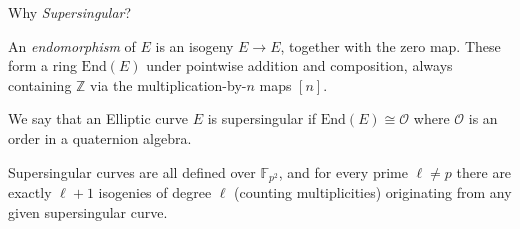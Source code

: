 \documentclass[10pt,aspectratio=169]{beamer}
\begin{document}
\begin{frame}{Why \emph{Supersingular}?}
  \begin{definition}
    An \emph{endomorphism} of $E$ is an isogeny $E \to E$, together with the zero map. These form a
    ring $\text{End}(E)$ under pointwise addition and composition, always containing $\mathbb{Z}$ via
    the multiplication-by-$n$ maps $[n]$.
  \end{definition}
  \vspace{0.5em}
  \begin{definition}
    We say that an Elliptic curve $E$ is supersingular if $\text{End}(E)\cong\mathcal{O}$ where $\mathcal{O}$ is
    an order in a quaternion algebra.
  \end{definition}
  \begin{theorem}
    Supersingular curves are all defined over $\mathbb{F}_{p^2}$, and for every prime $\ell \neq p$ there are
    exactly \alert{$\ell+1$} isogenies of degree $\ell$ (counting multiplicities) originating from any
    given supersingular curve.
  \end{theorem}
\end{frame}
\end{document}
